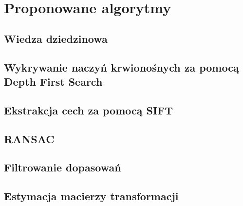 %
\chapter{Proponowane algorytmy}
\label{sec:proponowane_algorytmy}

\section{Wiedza dziedzinowa}
\label{sec:proponowane_algorytmy:wiedza_dziedzinowa}

\section{Wykrywanie naczyń krwionośnych za pomocą Depth First Search}
\label{sec:proponowane_algorytmy:depth_first_search}

\section{Ekstrakcja cech za pomocą SIFT}
\label{sec:proponowane_algorytmy:sift}

\section{RANSAC}
\label{sec:proponowane_algorytmy:ransac}

\section{Filtrowanie dopasowań}
\label{sec:proponowane_algorytmy:filtrowanie}

\section{Estymacja macierzy transformacji}
\label{sec:proponowane_algorytmy:estymacja}